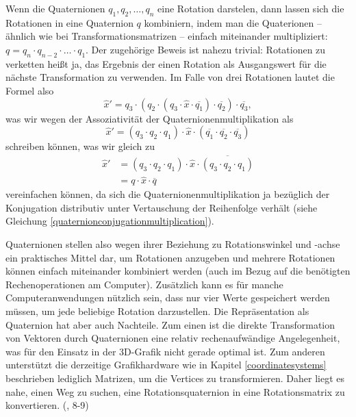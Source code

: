 Wenn die Quaternionen $q_1, q_2, \ldots, q_n$ eine Rotation darstelen, dann lassen sich die Rotationen in eine Quaternion $q$ kombiniern, indem man die Quaterionen -- ähnlich wie bei Transformationsmatrizen -- einfach miteinander multipliziert: $q = q_n \cdot q_{n-2} \cdot \ldots \cdot q_1$. Der zugehörige Beweis ist nahezu trivial: Rotationen zu verketten heißt ja, das Ergebnis der einen Rotation als Ausgangswert für die nächste Transformation zu verwenden. Im Falle von drei Rotationen lautet die Formel also
\begin{equation}
 \hat{x}' = q_3 \cdot ( q_2 \cdot ( q_3 \cdot \hat{x} \cdot \overline{q_1} ) \cdot \overline{q_2} ) \cdot \overline{q_3},
\end{equation}
was wir wegen der Assoziativität der Quaternionenmultiplikation als 
\begin{equation}
 \hat{x}' = ( q_3 \cdot q_2 \cdot q_1 ) \cdot \hat{x} \cdot ( \overline{q_1} \cdot \overline{q_2} \cdot \overline{q_3} )
\end{equation}
schreiben können, was wir gleich zu
\begin{equation}
\begin{split}
 \hat{x}' &= ( q_3 \cdot q_2 \cdot q_1 ) \cdot \hat{x} \cdot \overline{( q_3 \cdot q_2 \cdot q_1 )} \\
 &= q \cdot \hat{x} \cdot \overline{q}
\end{split}
\end{equation} 
vereinfachen können, da sich die Quaternionenmultiplikation ja bezüglich der Konjugation distributiv unter Vertauschung der Reihenfolge verhält (siehe Gleichung \ref{quaternionconjugationmultiplication}).

Quaternionen stellen also wegen ihrer Beziehung zu Rotationswinkel und -achse ein praktisches Mittel dar, um Rotationen anzugeben und mehrere Rotationen können einfach miteinander kombiniert werden (auch im Bezug auf die benötigten Rechenoperationen am Computer). Zusätzlich kann es für manche Computeranwendungen nützlich sein, dass nur vier Werte gespeichert werden müssen, um jede beliebige Rotation darzustellen. Die Repräsentation als Quaternion hat aber auch Nachteile. Zum einen ist die direkte Transformation von Vektoren durch Quaternionen eine relativ rechenaufwändige Angelegenheit, was für den Einsatz in der 3D-Grafik nicht gerade optimal ist. Zum anderen unterstützt die derzeitige Grafikhardware wie in Kapitel \ref{coordinatesystems} beschrieben lediglich Matrizen, um die Vertices zu transformieren. Daher liegt es nahe, einen Weg zu suchen, eine Rotationsquaternion in eine Rotationsmatrix zu konvertieren. (\vgl \citep{rotationissues}, 8-9)

